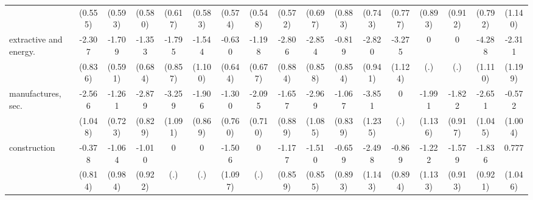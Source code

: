 {\begin{tabular}{l*{16}{c}}
                    &     (0.555)         &     (0.593)         &     (0.580)         &     (0.617)         &     (0.583)         &     (0.574)         &     (0.548)         &     (0.572)         &     (0.697)         &     (0.883)         &     (0.743)         &     (0.777)         &     (0.893)         &     (0.912)         &     (0.792)         &     (1.140)         \\
[1em]
extractive and energy.&      -2.307\sym{**} &      -1.709\sym{**} &      -1.353\sym{*}  &      -1.795\sym{*}  &      -1.544         &      -0.630         &      -1.198         &      -2.806\sym{**} &      -2.854\sym{***}&      -0.819         &      -2.820\sym{**} &      -3.275\sym{**} &           0         &           0         &      -4.288\sym{***}&      -2.311         \\
                    &     (0.836)         &     (0.591)         &     (0.684)         &     (0.857)         &     (1.100)         &     (0.644)         &     (0.677)         &     (0.884)         &     (0.858)         &     (0.854)         &     (0.941)         &     (1.124)         &         (.)         &         (.)         &     (1.110)         &     (1.199)         \\
[1em]
manufactures, sec.  &      -2.566\sym{*}  &      -1.261         &      -2.879\sym{***}&      -3.259\sym{**} &      -1.906\sym{*}  &      -1.300         &      -2.095\sym{**} &      -1.657         &      -2.969\sym{**} &      -1.067         &      -3.851\sym{**} &           0         &      -1.991         &      -1.822\sym{*}  &      -2.651\sym{*}  &      -0.572         \\
                    &     (1.048)         &     (0.723)         &     (0.829)         &     (1.091)         &     (0.869)         &     (0.760)         &     (0.710)         &     (0.889)         &     (1.085)         &     (0.839)         &     (1.235)         &         (.)         &     (1.136)         &     (0.917)         &     (1.045)         &     (1.004)         \\
[1em]
construction        &      -0.378         &      -1.064         &      -1.010         &           0         &           0         &      -1.506         &           0         &      -1.177         &      -1.510         &      -0.659         &      -2.498\sym{*}  &      -0.869         &      -1.222         &      -1.579         &      -1.836\sym{*}  &       0.777         \\
                    &     (0.814)         &     (0.984)         &     (0.922)         &         (.)         &         (.)         &     (1.097)         &         (.)         &     (0.859)         &     (0.855)         &     (0.893)         &     (1.143)         &     (0.894)         &     (1.133)         &     (0.913)         &     (0.921)         &     (1.046)         \\

\end{tabular}}
